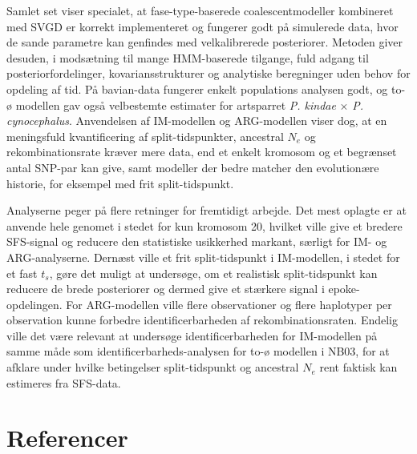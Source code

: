 \documentclass[
  10pt,
  a4paper,
]{scrbook}
\let\oldemph\emph
\renewcommand\emph[1]{\oldemph{\color{gray}#1}}
\begin{document}
Samlet set viser specialet, at fase-type-baserede coalescentmodeller
kombineret med SVGD er korrekt implementeret og fungerer godt på
simulerede data, hvor de sande parametre kan genfindes med
velkalibrerede posteriorer. Metoden giver desuden, i modsætning til
mange HMM-baserede tilgange, fuld adgang til posteriorfordelinger,
kovariansstrukturer og analytiske beregninger uden behov for opdeling af
tid. På bavian-data fungerer enkelt populations analysen godt, og to-ø
modellen gav også velbestemte estimater for artsparret \emph{P. kindae}
× \emph{P. cynocephalus}. Anvendelsen af IM-modellen og ARG-modellen
viser dog, at en meningsfuld kvantificering af split-tidspunkter,
ancestral \(N_e\) og rekombinationsrate kræver mere data, end et enkelt
kromosom og et begrænset antal SNP-par kan give, samt modeller der bedre
matcher den evolutionære historie, for eksempel med frit
split-tidspunkt.

Analyserne peger på flere retninger for fremtidigt arbejde. Det mest
oplagte er at anvende hele genomet i stedet for kun kromosom 20, hvilket
ville give et bredere SFS-signal og reducere den statistiske usikkerhed
markant, særligt for IM- og ARG-analyserne. Dernæst ville et frit
split-tidspunkt i IM-modellen, i stedet for et fast \(t_s\), gøre det
muligt at undersøge, om et realistisk split-tidspunkt kan reducere de
brede posteriorer og dermed give et stærkere signal i epoke-opdelingen.
For ARG-modellen ville flere observationer og flere haplotyper per
observation kunne forbedre identificerbarheden af rekombinationsraten.
Endelig ville det være relevant at undersøge identificerbarheden for
IM-modellen på samme måde som identificerbarheds-analysen for to-ø
modellen i NB03, for at afklare under hvilke betingelser split-tidspunkt
og ancestral \(N_e\) rent faktisk kan estimeres fra SFS-data.

\chapter{Referencer}\label{referencer}
\end{document}
